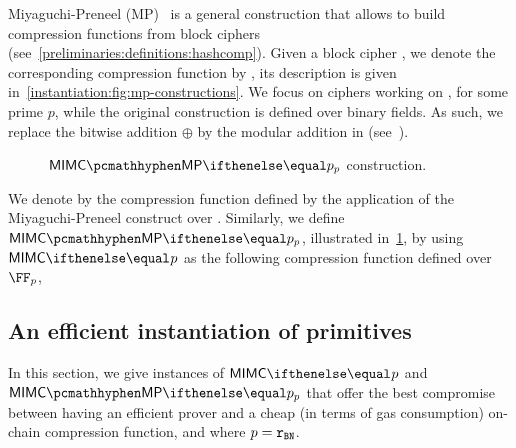 Miyaguchi-Preneel (MP)~\cite[$f_3$ function]{black2002black} is a general construction that allows to build compression functions from block ciphers (see~\cref{preliminaries:definitions:hashcomp}). Given a block cipher \Enc, we denote the corresponding compression function by \fMP{}, its description is given in~\cref{instantiation:fig:mp-constructions}. We focus on ciphers working on , for some prime $p$, while the original construction is defined over binary fields. As such, we replace the bitwise addition $\oplus$ by the modular addition in \FFx{\rBN} (see~\cite{mp-security-ethsnarks}).

\begin{figure*}[ht]
    \begin{minipage}[t]{0.50\textwidth}
        \caption{\MP{} construct in $\FFx{p}$.}\label{instantiation:fig:mp-constructions}
    \end{minipage}%
    \begin{minipage}[t]{0.50\textwidth}
    \caption{$\mimcMPPrime{p}$ construction.}\label{instantiation:fig:mimc-mp-constructions}
    \end{minipage}%
\end{figure*}

We denote by \mimcMP{} the compression function defined by the application of the Miyaguchi-Preneel construct over \mimc{}. Similarly, we define $\mimcMPPrime{p}$, illustrated in~\cref{instantiation:fig:mimc-mp-constructions}, by using $\mimcPrime{p}$ as the following compression function defined over $\FFx{p}$,

\subsection{An efficient instantiation of \mimc{} primitives}\label{instantiation:mkhash:efficient-instance}

\newcommand{\constraints}{\varstyle{constraints}}

In this section, we give instances of $\mimcPrime{p}$ and $\mimcMPPrime{p}$ that offer the best compromise between having an efficient prover and a cheap (in terms of gas consumption) on-chain compression function, and where $p=\mathtt{r_{BN}}$.

